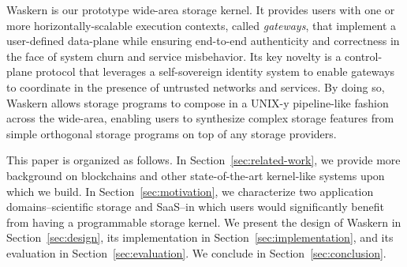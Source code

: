 Waskern is our prototype wide-area storage kernel.  It provides 
users with one or more horizontally-scalable execution contexts, called
\textit{gateways}, that implement a user-defined data-plane while ensuring
end-to-end authenticity and correctness in the face of system churn and service
misbehavior.  Its key novelty is a control-plane protocol
that leverages a self-sovereign identity system to enable gateways to coordinate in
the presence of untrusted networks and services.  By doing so, Waskern allows
storage programs to compose in a UNIX-y pipeline-like fashion across the wide-area,
enabling users to synthesize complex storage features from simple
orthogonal storage programs on top of any storage providers.

This paper is organized as follows.  In Section~\ref{sec:related-work}, we
provide more background on blockchains and other state-of-the-art kernel-like systems upon
which we build.  In Section~\ref{sec:motivation}, we characterize two
application domains--scientific storage and SaaS--in which users would
significantly benefit from having a programmable storage kernel.  We present the
design of Waskern in Section~\ref{sec:design}, its implementation in
Section~\ref{sec:implementation}, and its evaluation in
Section~\ref{sec:evaluation}.  We conclude in Section~\ref{sec:conclusion}.
